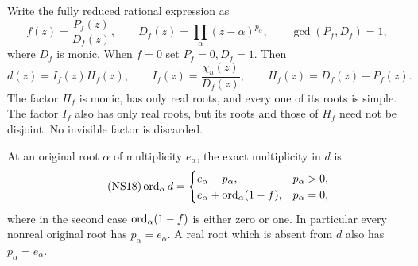 \begin{sfsectheorem}
\label{sfsec:thm:cancellation}
Write the fully reduced rational expression as
\begin{equation}\tag{NS16}\label{sfsec:NS16}
f(z)=\frac{P_f(z)}{D_f(z)},\qquad
D_f(z)=\prod_\alpha(z-\alpha)^{p_\alpha},\qquad
\gcd(P_f,D_f)=1,
\end{equation}
where $D_f$ is monic. When $f=0$ set $P_f=0,D_f=1$.
Then
\begin{equation}\tag{NS17}\label{sfsec:NS17}
d(z)=I_f(z)H_f(z),\qquad
I_f(z)=\frac{\chi_u(z)}{D_f(z)},\qquad
H_f(z)=D_f(z)-P_f(z).
\end{equation}
The factor $H_f$ is monic, has only real roots, and every
one of its roots is simple. The factor $I_f$ also has only
real roots, but its roots and those of $H_f$ need not be
disjoint. No invisible factor is discarded.

At an original root $\alpha$ of multiplicity $e_\alpha$,
the exact multiplicity in $d$ is
\begin{equation}\tag{NS18}\label{sfsec:NS18}
\operatorname{ord}_\alpha d=
\begin{cases}
e_\alpha-p_\alpha,&p_\alpha>0,\\
e_\alpha+\operatorname{ord}_\alpha(1-f),&p_\alpha=0,
\end{cases}
\end{equation}
where in the second case $\operatorname{ord}_\alpha(1-f)$ is either
zero or one. In particular every nonreal original root
has $p_\alpha=e_\alpha$. A real root which is absent from
$d$ also has $p_\alpha=e_\alpha$.
\end{sfsectheorem}
